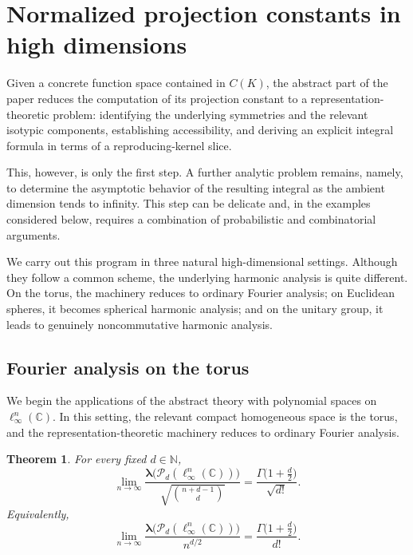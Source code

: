 \documentclass[11pt,showkeys]{amsart}
\newtheorem{theorem}{Theorem}[section]
\begin{document}

\section{Normalized projection constants in high dimensions}
Given a concrete function space contained in $C(K)$, the abstract part of the paper reduces the computation of its projection constant to a representation-theoretic problem: identifying the underlying symmetries and the relevant isotypic components, establishing accessibility, and deriving an explicit integral formula in terms of a reproducing-kernel slice.

This, however, is only the first step. A further analytic problem remains, namely, to determine the asymptotic behavior of the resulting integral as the ambient dimension tends to infinity. This step can be delicate and, in the examples considered below, requires a combination of probabilistic and combinatorial arguments.

We carry out this program in three natural high-dimensional settings. Although they follow a common scheme, the underlying harmonic analysis is quite different. On the torus, the machinery reduces to ordinary Fourier analysis; on Euclidean spheres, it becomes spherical harmonic analysis; and on the unitary group, it leads to genuinely noncommutative harmonic analysis.




\subsection{Fourier analysis on the torus}
\label{sec:torus-application}

We begin the applications of the abstract theory with polynomial spaces on
\(\ell_\infty^n(\mathbb C)\). In this setting, the relevant compact
homogeneous space is the torus, and the repre\-sentation-theoretic machinery
reduces to ordinary Fourier analysis.

\begin{theorem}
\label{thm:torus-polynomial-projection-asymptotic}
For every fixed \(d\in\mathbb N\),
\[
    \lim_{n\to\infty}
    \frac{
        \boldsymbol\lambda\bigl(\mathcal P_d(\ell_\infty^n(\mathbb C))\bigr)
    }{
        \sqrt{\binom{n+d-1}{d}}
    }
    =
    \frac{\Gamma\bigl(1+\frac d2\bigr)}{\sqrt{d!}}.
\]
Equivalently,
\[
    \lim_{n\to\infty}
    \frac{
        \boldsymbol\lambda\bigl(\mathcal P_d(\ell_\infty^n(\mathbb C))\bigr)
    }{
        n^{d/2}
    }
    =
    \frac{\Gamma\bigl(1+\frac d2\bigr)}{d!}.
\]
\end{theorem}
\end{document}
